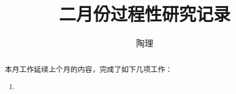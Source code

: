 \documentclass[lang=cn]{elegantpaper}
\title{二月份过程性研究记录}
\author{陶理}
\begin{document}
\maketitle

\begin{abstract}
    本月工作延续上个月的内容，完成了如下几项工作：
    \begin{enumerate}
        \item 
    \end{enumerate}
\end{abstract}
\end{document}
